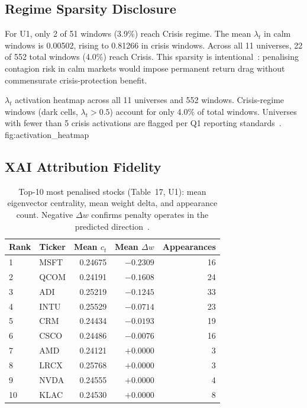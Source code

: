 \subsection{Regime Sparsity Disclosure}

For U1, only 2 of 51 windows (3.9\%) reach Crisis regime. The mean
$\lambda_t$ in calm windows is 0.00502, rising to 0.81266 in crisis
windows. Across all 11 universes, 22 of 552 total windows (4.0\%) reach
Crisis. This sparsity is intentional~\citep{ang2002,hamilton1989}:
penalising contagion risk in calm markets would impose permanent return
drag without commensurate crisis-protection benefit.

  {$\lambda_t$ activation heatmap across all 11 universes and 552
   windows. Crisis-regime windows (dark cells, $\lambda_t > 0.5$)
   account for only 4.0\% of total windows. Universes with fewer
   than 5 crisis activations are flagged per Q1 reporting
   standards~\citep{harvey2016}.}
  {fig:activation_heatmap}

\subsection{XAI Attribution Fidelity}

\begin{table}[htbp]
\centering
\caption{Top-10 most penalised stocks (Table~17, U1): mean eigenvector
         centrality, mean weight delta, and appearance count.
         Negative $\Delta w$ confirms penalty operates in the predicted
         direction~\citep{bonacich1987,arrieta2020}.}
\label{tab:top10_penalised}
\begin{tabular}{llrrr}
\toprule
Rank & Ticker & Mean $c_t$ & Mean $\Delta w$ & Appearances \\
\midrule
1  & MSFT & 0.24675 & $-0.2309$ & 16 \\
2  & QCOM & 0.24191 & $-0.1608$ & 24 \\
3  & ADI  & 0.25219 & $-0.1245$ & 33 \\
4  & INTU & 0.25529 & $-0.0714$ & 23 \\
5  & CRM  & 0.24434 & $-0.0193$ & 19 \\
6  & CSCO & 0.24486 & $-0.0076$ & 16 \\
7  & AMD  & 0.24121 & $+0.0000$ & 3  \\
8  & LRCX & 0.25768 & $+0.0000$ & 3  \\
9  & NVDA & 0.24555 & $+0.0000$ & 4  \\
10 & KLAC & 0.24530 & $+0.0000$ & 8  \\
\bottomrule
\end{tabular}
\end{table}

